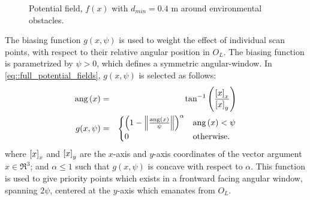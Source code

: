 				\begin{figure}[t!]
					\centering
					\caption{Potential field, $f(x)$ with $d_{min}=0.4\text{ m}$ around environmental obstacles.}
					\label{fig::potential_field}
				\end{figure}

			The biasing function $g(x,\psi)$ is used to weight the effect of individual scan points, with respect to their relative angular position in $O_{L}$. The biasing function is parametrized by $\psi>0$, which defines a symmetric angular-window. In \ref{eq::full_potential_fields}, $g(x,\psi)$ is selected as follows:
				\begin{eqnarray}
					\text{ang}\left(x\right) &=& \tan^{-1}\left( \frac{\left[x\right]_{x}}{\left[x\right]_{y}} \right) \nonumber\\
					g(x,\psi) &=& 
					\begin{cases}
					\left(1-\left\lVert\frac{\text{ang}\left(x\right)}{\psi}\right\rVert\right)^{\alpha}	& \text{ang}\left(x\right) < \psi \\
					0 	& \text{otherwise}.
					\end{cases}
				\end{eqnarray}
			where $\left[x\right]_{x}$ and $\left[x\right]_{y}$ are the $x$-axis and $y$-axis coordinates of the vector argument $x\in\Re^{3}$; and $\alpha\leq1$ such that $g(x,\psi)$ is concave with respect to $\alpha$. This function is used to give priority points which exists in a frontward facing angular window, spanning $2 \psi$, centered at the $y$-axis which emanates from $O_{L}$. %

